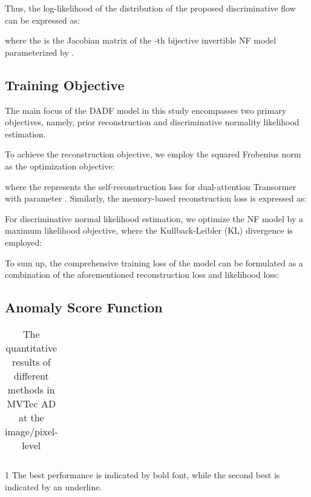 \documentclass[journal]{IEEEtran}
\begin{document}
Thus, the log-likelihood of the distribution of the proposed discriminative flow can be expressed as:

where the  is the Jacobian matrix of the 
-th bijective invertible NF model parameterized by . 



\subsection{Training Objective}
The main focus of the DADF model in this study encompasses two primary objectives, namely, prior reconstruction and discriminative normality likelihood estimation. 

To achieve the reconstruction objective, we employ the squared Frobenius norm as the optimization objective:

where the  represents the self-reconstruction loss for dual-attention Transormer with parameter . Similarly, the memory-based reconstruction loss  is expressed as:


For discriminative normal likelihood estimation, we optimize the NF model by a maximum likelihood objective, where the Kullback-Leibler (KL) divergence   is employed:


To sum up, the comprehensive training loss of the model can be formulated as a combination of the aforementioned reconstruction loss and likelihood loss:

\subsection{Anomaly Score Function}

\begin{table*}
\caption{{The quantitative results of different methods in MVTec AD at the image/pixel-level}}
\label{table}
\setlength{\tabcolsep}{3pt}
\begin{threeparttable}
\begin{tabular}{p{\textwidth}}

\end{tabular}
\begin{tablenotes}
       \footnotesize
       \item[1]The best performance is indicated by bold font, while the second best is indicated by an underline.
\end{tablenotes}
\end{threeparttable}
\label{table1}
\end{table*}
\end{document}
